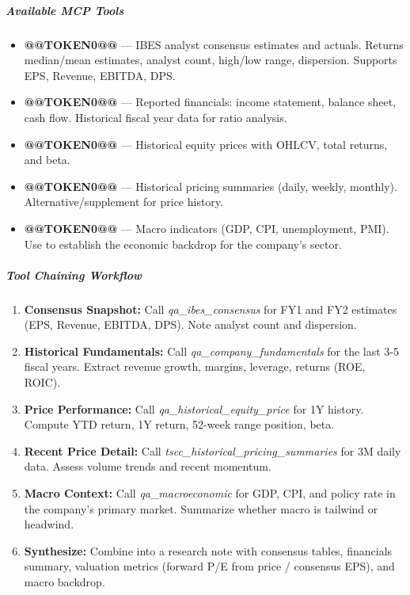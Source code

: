 \documentclass[11pt]{article}
\begin{document}
\subparagraph{Available MCP Tools}\mbox{}\par

\begin{itemize}[leftmargin=*,itemsep=2pt,topsep=2pt]
\item {} \textbf{@@TOKEN0@@} — IBES analyst consensus estimates and actuals. Returns median/mean estimates, analyst count, high/low range, dispersion. Supports EPS, Revenue, EBITDA, DPS.
\item {} \textbf{@@TOKEN0@@} — Reported financials: income statement, balance sheet, cash flow. Historical fiscal year data for ratio analysis.
\item {} \textbf{@@TOKEN0@@} — Historical equity prices with OHLCV, total returns, and beta.
\item {} \textbf{@@TOKEN0@@} — Historical pricing summaries (daily, weekly, monthly). Alternative/supplement for price history.
\item {} \textbf{@@TOKEN0@@} — Macro indicators (GDP, CPI, unemployment, PMI). Use to establish the economic backdrop for the company's sector.
\end{itemize}

\subparagraph{Tool Chaining Workflow}\mbox{}\par

\begin{enumerate}[leftmargin=*,itemsep=2pt,topsep=2pt]
\item {} \textbf{Consensus Snapshot:} Call \emph{qa\_\allowbreak{}ibes\_\allowbreak{}consensus} for FY1 and FY2 estimates (EPS, Revenue, EBITDA, DPS). Note analyst count and dispersion.
\item {} \textbf{Historical Fundamentals:} Call \emph{qa\_\allowbreak{}company\_\allowbreak{}fundamentals} for the last 3-5 fiscal years. Extract revenue growth, margins, leverage, returns (ROE, ROIC).
\item {} \textbf{Price Performance:} Call \emph{qa\_\allowbreak{}historical\_\allowbreak{}equity\_\allowbreak{}price} for 1Y history. Compute YTD return, 1Y return, 52-week range position, beta.
\item {} \textbf{Recent Price Detail:} Call \emph{tscc\_\allowbreak{}historical\_\allowbreak{}pricing\_\allowbreak{}summaries} for 3M daily data. Assess volume trends and recent momentum.
\item {} \textbf{Macro Context:} Call \emph{qa\_\allowbreak{}macroeconomic} for GDP, CPI, and policy rate in the company's primary market. Summarize whether macro is tailwind or headwind.
\item {} \textbf{Synthesize:} Combine into a research note with consensus tables, financials summary, valuation metrics (forward P/E from price / consensus EPS), and macro backdrop.
\end{enumerate}
\end{document}
